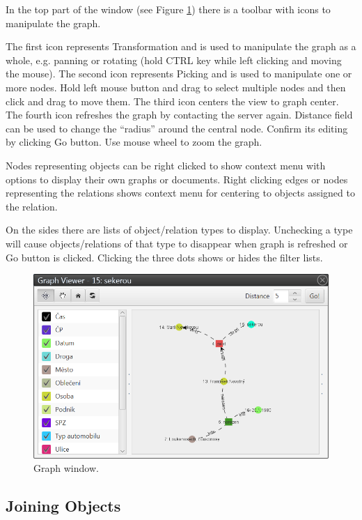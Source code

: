 In the top part of the window (see Figure \ref{fig:Graph}) there is a toolbar
with icons to manipulate the graph.

The first icon represents Transformation and is used to manipulate the graph as
a whole, e.g. panning or rotating (hold CTRL key while left clicking and moving
the mouse). The second icon represents Picking and is used to manipulate one or
more nodes. Hold left mouse button and drag to select multiple nodes and then
click and drag to move them. The third icon centers the view to graph center.
The fourth icon refreshes the graph by contacting the server again. Distance
field can be used to change the ``radius'' around the central node. Confirm its
editing by clicking Go button. Use mouse wheel to zoom the graph.

Nodes representing objects can be right clicked to show context menu with
options to display their own graphs or documents. Right clicking edges or
nodes representing the relations shows context menu for centering to objects
assigned to the relation.

On the sides there are lists of object/relation types to display. Unchecking
a type will cause objects/relations of that type to disappear when graph is
refreshed or Go button is clicked. Clicking the three dots shows or hides the
filter lists.

\begin{figure}[!htb]
        \centering
        \includegraphics[width=\textwidth]{Images/graph}
        \caption{Graph window.}
        \label{fig:Graph}
\end{figure}

\subsection{Joining Objects}
\label{ssec:JoinObjects}

